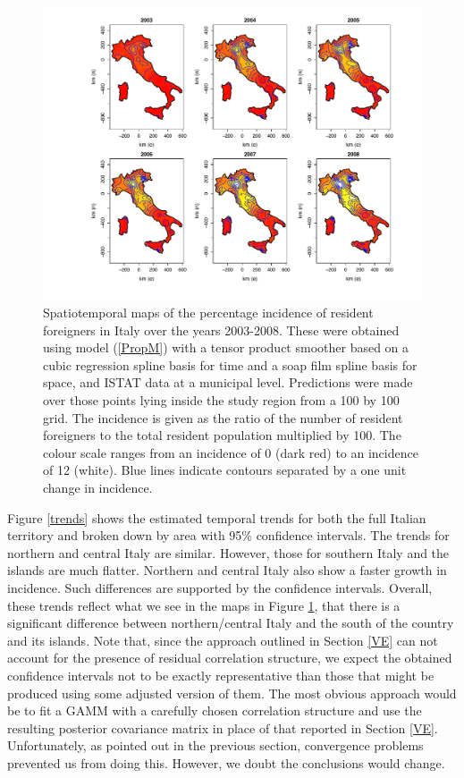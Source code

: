 \begin{figure}[tbp]
	\centering
		\includegraphics[width=\textwidth]{it/maps-Soap.pdf}
	\caption{Spatiotemporal maps of the percentage incidence of resident foreigners in Italy over the years 2003-2008. These were obtained using model (\ref{PropM}) with a tensor product smoother based on a cubic regression spline basis for time and a soap film spline basis for space, and ISTAT data at a municipal level. Predictions were made over those points lying inside the study region from a 100 by 100 grid. The incidence is given as the ratio of the number of resident foreigners to the total resident population multiplied by 100. The colour scale ranges from an incidence of 0 (dark red) to an incidence of 12 (white). Blue lines indicate contours separated by a one unit change in incidence.}
	\label{fig1}
\end{figure}

Figure \ref{trends} shows the estimated temporal trends for both the full Italian territory and broken down by area with 95\% confidence intervals. The trends for northern and central Italy are similar. However, those for southern Italy and the islands are much flatter. Northern and central Italy also show a faster growth in incidence. Such differences are supported by the confidence intervals. Overall, these trends reflect what we see in the maps in Figure \ref{fig1}, that there is a significant difference between northern/central Italy and the south of the country and its islands. Note that, since the approach outlined in Section \ref{VE} can not account for the presence of residual correlation structure, we expect the obtained confidence intervals not to be exactly representative than those that might be produced using some adjusted version of them. The most obvious approach would be to fit a GAMM with a carefully chosen correlation structure and use the resulting posterior covariance matrix in place of that reported in Section \ref{VE}. Unfortunately, as pointed out in the previous section, convergence problems prevented us from doing this. However, we doubt the conclusions would change.

